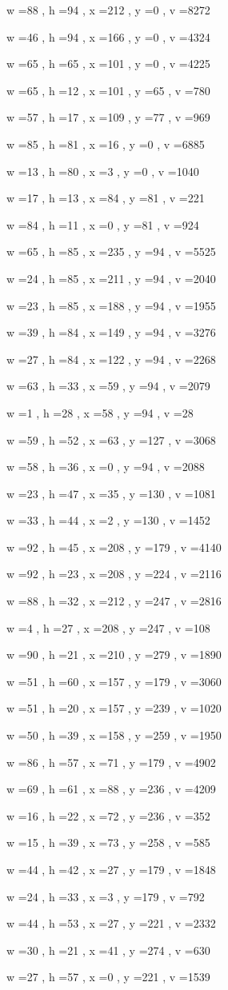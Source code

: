 \documentclass[11pt]{article}
\begin{document}
w =88 , h =94 , x =212 , y =0 , v =8272
\par
w =46 , h =94 , x =166 , y =0 , v =4324
\par
w =65 , h =65 , x =101 , y =0 , v =4225
\par
w =65 , h =12 , x =101 , y =65 , v =780
\par
w =57 , h =17 , x =109 , y =77 , v =969
\par
w =85 , h =81 , x =16 , y =0 , v =6885
\par
w =13 , h =80 , x =3 , y =0 , v =1040
\par
w =17 , h =13 , x =84 , y =81 , v =221
\par
w =84 , h =11 , x =0 , y =81 , v =924
\par
w =65 , h =85 , x =235 , y =94 , v =5525
\par
w =24 , h =85 , x =211 , y =94 , v =2040
\par
w =23 , h =85 , x =188 , y =94 , v =1955
\par
w =39 , h =84 , x =149 , y =94 , v =3276
\par
w =27 , h =84 , x =122 , y =94 , v =2268
\par
w =63 , h =33 , x =59 , y =94 , v =2079
\par
w =1 , h =28 , x =58 , y =94 , v =28
\par
w =59 , h =52 , x =63 , y =127 , v =3068
\par
w =58 , h =36 , x =0 , y =94 , v =2088
\par
w =23 , h =47 , x =35 , y =130 , v =1081
\par
w =33 , h =44 , x =2 , y =130 , v =1452
\par
w =92 , h =45 , x =208 , y =179 , v =4140
\par
w =92 , h =23 , x =208 , y =224 , v =2116
\par
w =88 , h =32 , x =212 , y =247 , v =2816
\par
w =4 , h =27 , x =208 , y =247 , v =108
\par
w =90 , h =21 , x =210 , y =279 , v =1890
\par
w =51 , h =60 , x =157 , y =179 , v =3060
\par
w =51 , h =20 , x =157 , y =239 , v =1020
\par
w =50 , h =39 , x =158 , y =259 , v =1950
\par
w =86 , h =57 , x =71 , y =179 , v =4902
\par
w =69 , h =61 , x =88 , y =236 , v =4209
\par
w =16 , h =22 , x =72 , y =236 , v =352
\par
w =15 , h =39 , x =73 , y =258 , v =585
\par
w =44 , h =42 , x =27 , y =179 , v =1848
\par
w =24 , h =33 , x =3 , y =179 , v =792
\par
w =44 , h =53 , x =27 , y =221 , v =2332
\par
w =30 , h =21 , x =41 , y =274 , v =630
\par
w =27 , h =57 , x =0 , y =221 , v =1539
\par
\newpage
\end{document}
